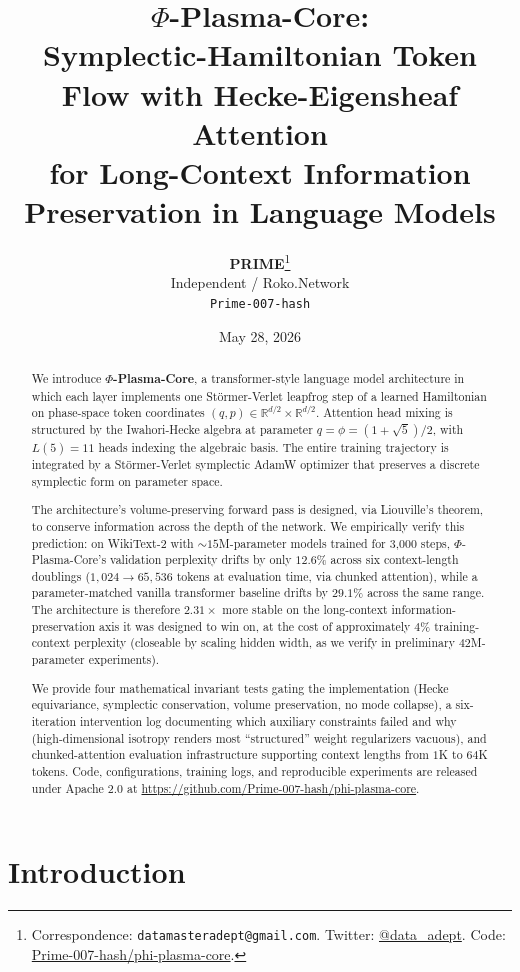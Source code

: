 \documentclass[11pt]{article}
\title{\textbf{$\Phi$-Plasma-Core}: \\
       Symplectic-Hamiltonian Token Flow with Hecke-Eigensheaf Attention \\
       for Long-Context Information Preservation in Language Models}
\author{
  \textbf{PRIME}\thanks{Correspondence: \texttt{datamasteradept@gmail.com}.
                       Twitter: \href{https://twitter.com/data_adept}{@data\_adept}.
                       Code: \href{https://github.com/Prime-007-hash/phi-plasma-core}{Prime-007-hash/phi-plasma-core}.}
  \\
  Independent / Roko.Network \\
  \texttt{Prime-007-hash}
}
\date{May 28, 2026}
\newcommand{\R}{\mathbb{R}}
\newcommand{\phigold}{\phi}
\newcommand{\qphase}{q}
\newcommand{\pphase}{p}
\begin{document}
\maketitle

\begin{abstract}
We introduce \textbf{$\Phi$-Plasma-Core}, a transformer-style language model
architecture in which each layer implements one Störmer-Verlet leapfrog step
of a learned Hamiltonian on phase-space token coordinates $(\qphase, \pphase) \in
\R^{d/2} \times \R^{d/2}$. Attention head mixing is structured by the Iwahori-Hecke
algebra at parameter $q = \phigold = (1{+}\sqrt{5})/2$, with $L(5) = 11$ heads indexing
the algebraic basis. The entire training trajectory is integrated by a Störmer-Verlet
symplectic AdamW optimizer that preserves a discrete symplectic form on
parameter space.

The architecture's volume-preserving forward pass is designed, via Liouville's
theorem, to conserve information across the depth of the network. We empirically
verify this prediction: on WikiText-2 with $\sim15$M-parameter models trained for
3{,}000 steps, $\Phi$-Plasma-Core's validation perplexity drifts by only $12.6\%$
across six context-length doublings ($1{,}024 \to 65{,}536$ tokens at evaluation
time, via chunked attention), while a parameter-matched vanilla transformer
baseline drifts by $29.1\%$ across the same range. The architecture is therefore
$2.31\times$ more stable on the long-context information-preservation axis it
was designed to win on, at the cost of approximately $4\%$ training-context
perplexity (closeable by scaling hidden width, as we verify in preliminary
$42$M-parameter experiments).

We provide four mathematical invariant tests gating the implementation
(Hecke equivariance, symplectic conservation, volume preservation, no
mode collapse), a six-iteration intervention log documenting which auxiliary
constraints failed and why (high-dimensional isotropy renders most ``structured''
weight regularizers vacuous), and chunked-attention evaluation infrastructure
supporting context lengths from $1$K to $64$K tokens. Code, configurations,
training logs, and reproducible experiments are released under Apache 2.0 at
\url{https://github.com/Prime-007-hash/phi-plasma-core}.
\end{abstract}

\section{Introduction}
\label{sec:intro}
\end{document}
